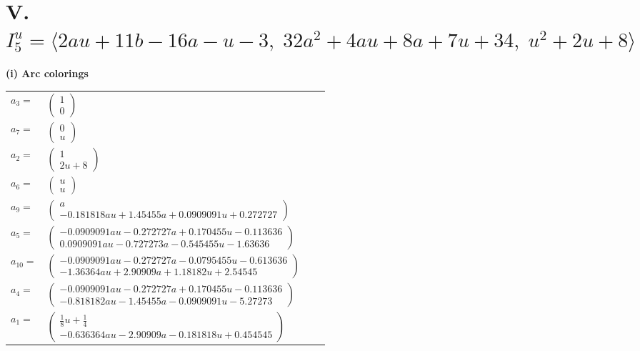 \documentclass[1p]{elsarticle_modified}
\theoremstyle{definition}
\begin{document}
\centering \section*{V. $I^u_{5}= \langle 2 a u+11 b-16 a- u-3,\;32 a^2+4 a u+8 a+7 u+34,\;u^2+2 u+8 \rangle$}
\flushleft \textbf{(i) Arc colorings}\\
\begin{tabular}{m{7pt} m{180pt} m{7pt} m{180pt} }
\flushright $a_{3}=$&$\begin{pmatrix}1\\0\end{pmatrix}$ \\
\flushright $a_{7}=$&$\begin{pmatrix}0\\u\end{pmatrix}$ \\
\flushright $a_{2}=$&$\begin{pmatrix}1\\2 u+8\end{pmatrix}$ \\
\flushright $a_{6}=$&$\begin{pmatrix}u\\u\end{pmatrix}$ \\
\flushright $a_{9}=$&$\begin{pmatrix}a\\-0.181818 a u+1.45455 a+0.0909091 u+0.272727\end{pmatrix}$ \\
\flushright $a_{5}=$&$\begin{pmatrix}-0.0909091 a u-0.272727 a+0.170455 u-0.113636\\0.0909091 a u-0.727273 a-0.545455 u-1.63636\end{pmatrix}$ \\
\flushright $a_{10}=$&$\begin{pmatrix}-0.0909091 a u-0.272727 a-0.0795455 u-0.613636\\-1.36364 a u+2.90909 a+1.18182 u+2.54545\end{pmatrix}$ \\
\flushright $a_{4}=$&$\begin{pmatrix}-0.0909091 a u-0.272727 a+0.170455 u-0.113636\\-0.818182 a u-1.45455 a-0.0909091 u-5.27273\end{pmatrix}$ \\
\flushright $a_{1}=$&$\begin{pmatrix}\frac{1}{8} u+\frac{1}{4}\\-0.636364 a u-2.90909 a-0.181818 u+0.454545\end{pmatrix}$ \\

\end{tabular}
\end{document}
